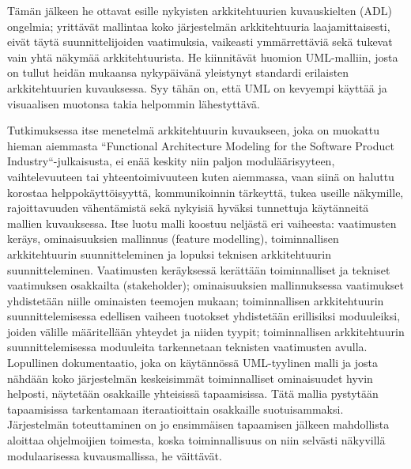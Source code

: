 \documentclass[finnish]{tktltiki2}
\theoremstyle{definition}
\theoremstyle{remark}
\begin{document}
\iffalse
Nykyisestä kirjallisuudesta he etsivät materiaalia tutkimuksen tueksi funktionaalisen arkkitehtuurin mallinnuksesta ja vaatimuksista ohjelmistoarkkitehtuurin mallinnuksessa.
Funktionaalisen arkkitehtuurin mallinuksesta he viittaavat Brinkkemperin tutkimukseen, jossa tutkittiin funktionaalisen arkkitehtuurin diagrammien käyttöä ja jonka tulos oli, että niiden käyttö on rajoittunutta tiettyihin alueisiin ja usein rakenteiltaan sekavahkoa. He jatkavat viittaamalla myös Vlietin tutkimukseen, jossa tultiin päätelmään, että arkkitehtuurin suunnittelun pitäisi sijaita vaatimusten keräysten ja teknisen suunnittelun välissä. 
Vaatimuksista 
\fi
Tämän jälkeen he ottavat esille nykyisten arkkitehtuurien kuvauskielten (ADL) ongelmia; yrittävät mallintaa koko järjestelmän arkkitehtuuria laajamittaisesti, eivät täytä suunnittelijoiden vaatimuksia, vaikeasti ymmärrettäviä sekä tukevat vain yhtä näkymää arkkitehtuurista. He kiinnitävät huomion UML-malliin, josta on tullut heidän mukaansa nykypäivänä yleistynyt standardi erilaisten arkkitehtuurien kuvauksessa. Syy tähän on, että UML on kevyempi käyttää ja visuaalisen muotonsa takia helpommin lähestyttävä. 

Tutkimuksessa itse menetelmä arkkitehtuurin kuvaukseen, joka on muokattu hieman aiemmasta ``Functional Architecture Modeling for the Software Product Industry``-julkaisusta, ei enää keskity niin paljon moduläärisyyteen, vaihtelevuuteen tai yhteentoimivuuteen kuten aiemmassa, vaan siinä on haluttu korostaa helppokäyttöisyyttä, kommunikoinnin tärkeyttä, tukea useille näkymille, rajoittavuuden vähentämistä sekä nykyisiä hyväksi tunnettuja käytänneitä mallien kuvauksessa. Itse luotu malli koostuu neljästä eri vaiheesta: vaatimusten keräys, ominaisuuksien mallinnus (feature modelling), toiminnallisen arkkitehtuurin suunnitteleminen ja lopuksi teknisen arkkitehtuurin suunnitteleminen. Vaatimusten keräyksessä kerättään toiminnalliset ja tekniset vaatimuksen osakkailta (stakeholder); ominaisuuksien mallinnuksessa vaatimukset yhdistetään niille ominaisten teemojen mukaan; toiminnallisen arkkitehtuurin suunnittelemisessa edellisen vaiheen tuotokset yhdistetään erillisiksi moduuleiksi, joiden välille määritellään yhteydet ja niiden tyypit; toiminnallisen arkkitehtuurin suunnittelemisessa moduuleita tarkennetaan teknisten vaatimusten avulla. Lopullinen dokumentaatio, joka on käytännössä UML-tyylinen malli ja josta nähdään koko järjestelmän keskeisimmät toiminnalliset ominaisuudet hyvin helposti, näytetään osakkaille yhteisissä tapaamisissa. Tätä mallia pystytään tapaamisissa tarkentamaan iteraatioittain osakkaille suotuisammaksi. Järjestelmän toteuttaminen on jo ensimmäisen tapaamisen jälkeen mahdollista aloittaa ohjelmoijien toimesta, koska toiminnallisuus on niin selvästi näkyvillä modulaarisessa kuvausmallissa, he väittävät. 
\end{document}
